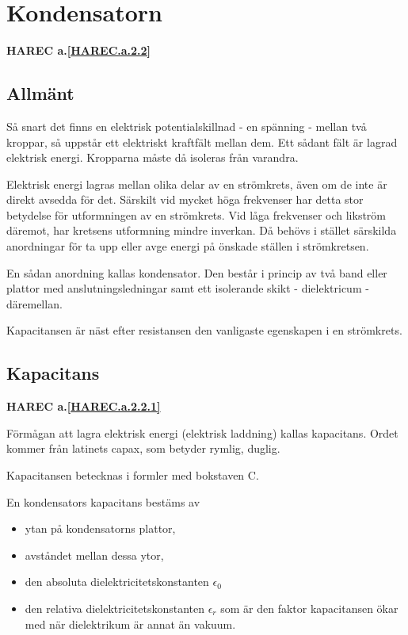 \section{Kondensatorn}
\textbf{HAREC a.\ref{HAREC.a.2.2}\label{myHAREC.a.2.2}}

\subsection{Allmänt}

Så snart det finns en elektrisk potentialskillnad - en spänning - mellan två
kroppar, så uppstår ett elektriskt kraftfält mellan dem. Ett sådant fält är
lagrad elektrisk energi. Kropparna måste då isoleras från varandra.

Elektrisk energi lagras mellan olika delar av en strömkrets, även om de inte är
direkt avsedda för det. Särskilt vid mycket höga frekvenser har detta stor
betydelse för utformningen av en strömkrets. Vid låga frekvenser och likström
däremot, har kretsens utformning mindre inverkan. Då behövs i stället särskilda
anordningar för ta upp eller avge energi på önskade ställen i strömkretsen.

En sådan anordning kallas kondensator. Den består i princip av två band eller
plattor med anslutningsledningar samt ett isolerande skikt - dielektricum -
däremellan.

Kapacitansen är näst efter resistansen den vanligaste egenskapen i en
strömkrets.

\subsection{Kapacitans}
\textbf{HAREC a.\ref{HAREC.a.2.2.1}\label{myHAREC.a.2.2.1}}

Förmågan att lagra elektrisk energi (elektrisk laddning) kallas kapacitans.
Ordet kommer från latinets capax, som betyder rymlig, duglig.

Kapacitansen betecknas i formler med bokstaven C.

En kondensators kapacitans bestäms av
\begin{itemize}
  \item ytan på kondensatorns plattor,
  \item avståndet mellan dessa ytor,
  \item den absoluta dielektricitetskonstanten \(\epsilon_0\)
  \item den relativa dielektricitetskonstanten \(\epsilon_r\) som är den faktor
kapacitansen ökar med när dielektrikum är annat än vakuum.
\end{itemize}


